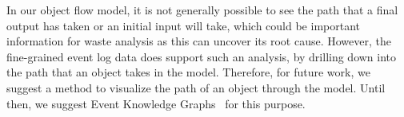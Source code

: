 In our object flow model, it is not generally possible to see the path that a final output has taken or an initial input will take, which could be important information for waste analysis as this can uncover its root cause.
However, the fine-grained event log data does support such an analysis, by drilling down into the path that an object takes in the model.
Therefore, for future work, we suggest a method to visualize the path of an object through the model.
Until then, we suggest Event Knowledge Graphs~\autocite{fahland2022} for this purpose.



